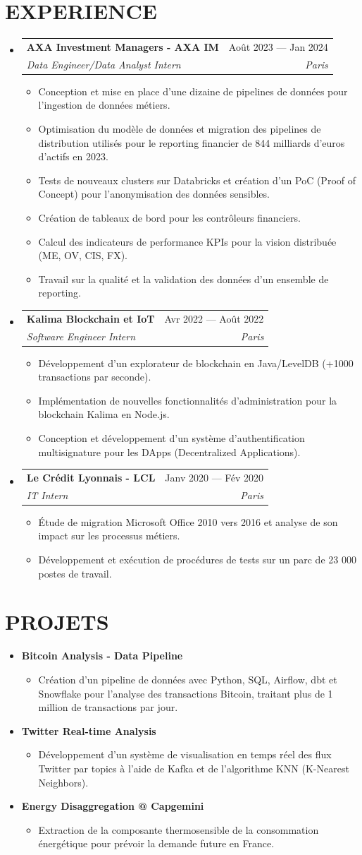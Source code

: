 \documentclass[11pt,a4paper]{article}
\makeatletter
\newcommand{\resumeItem}[1]{
  \item\footnotesize{
    {#1 \vspace{-1pt}}
  }
}
\newcommand{\resumeSubheading}[4]{
  \vspace{2pt}\item
    \begin{tabular*}{\textwidth}[t]{l@{\extracolsep{\fill}}r}
      {\small\textbf{#1}} & {\footnotesize#2} \\
      {\footnotesize\textit{#3}} & {\footnotesize\textit{#4}} \\
    \end{tabular*}\vspace{-4pt}
}
\newcommand{\resumeProjectHeading}[2]{
  \item
  {#1} \hfill {#2}
}
\newcommand{\resumeSubHeadingListStart}{\begin{itemize}[leftmargin=0in, label={}]}
\newcommand{\resumeSubHeadingListEnd}{\end{itemize}}
\newcommand{\resumeItemListStart}{\begin{itemize}[label={\textbullet}]}
\newcommand{\resumeItemListEnd}{\end{itemize}\vspace{0pt}}
\makeatother
\begin{document}
\section{EXPERIENCE}
\resumeSubHeadingListStart
    \resumeSubheading
      {AXA Investment Managers - AXA IM}{Août 2023 --- Jan 2024}
      {Data Engineer/Data Analyst Intern}{Paris}
      \resumeItemListStart
        \resumeItem{Conception et mise en place d'une dizaine de pipelines de données pour l'ingestion de données métiers.}
        \resumeItem{Optimisation du modèle de données et migration des pipelines de distribution utilisés pour le reporting financier de 844 milliards d'euros d'actifs en 2023.}
        \resumeItem{Tests de nouveaux clusters sur Databricks et création d'un PoC (Proof of Concept) pour l'anonymisation des données sensibles.}
        \resumeItem{Création de tableaux de bord pour les contrôleurs financiers.}
        \resumeItem{Calcul des indicateurs de performance KPIs pour la vision distribuée (ME, OV, CIS, FX).}
        \resumeItem{Travail sur la qualité et la validation des données d'un ensemble de reporting.}
      \resumeItemListEnd
    \resumeSubheading
      {Kalima Blockchain et IoT}{Avr 2022 --- Août 2022}
      {Software Engineer Intern}{Paris}
      \resumeItemListStart
        \resumeItem{Développement d'un explorateur de blockchain en Java/LevelDB (+1000 transactions par seconde).}
        \resumeItem{Implémentation de nouvelles fonctionnalités d'administration pour la blockchain Kalima en Node.js.}
        \resumeItem{Conception et développement d'un système d'authentification multisignature pour les DApps (Decentralized Applications).}
      \resumeItemListEnd
    \resumeSubheading
      {Le Crédit Lyonnais - LCL}{Janv 2020 --- Fév 2020}
      {IT Intern}{Paris}
      \resumeItemListStart
        \resumeItem{Étude de migration Microsoft Office 2010 vers 2016 et analyse de son impact sur les processus métiers.}
        \resumeItem{Développement et exécution de procédures de tests sur un parc de 23 000 postes de travail.}
      \resumeItemListEnd
  \resumeSubHeadingListEnd

\section{PROJETS}
\resumeSubHeadingListStart
    \resumeProjectHeading
      {\textbf{Bitcoin Analysis - Data Pipeline}} {}
      \resumeItemListStart
        \resumeItem{Création d'un pipeline de données avec Python, SQL, Airflow, dbt et Snowflake pour l'analyse des transactions Bitcoin, traitant plus de 1 million de transactions par jour.}
      \resumeItemListEnd
    \resumeProjectHeading
      {\textbf{Twitter Real-time Analysis}} {}
      \resumeItemListStart
        \resumeItem{Développement d'un système de visualisation en temps réel des flux Twitter par topics à l'aide de Kafka et de l'algorithme KNN (K-Nearest Neighbors).}
      \resumeItemListEnd
    \resumeProjectHeading
      {\textbf{Energy Disaggregation @ Capgemini}} {}
      \resumeItemListStart
        \resumeItem{Extraction de la composante thermosensible de la consommation énergétique pour prévoir la demande future en France.}
      \resumeItemListEnd
\resumeSubHeadingListEnd
\end{document}
